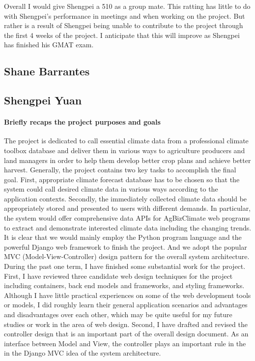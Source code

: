 \documentclass[onecolumn, draftclsnofoot,10pt, compsoc]{article}
\begin{document}
		Overall I would give Shengpei a 5\/10 as a group mate. This ratting has little to do with Shengpei's performance in meetings and when working on the project. But rather is a result of Shengpei being unable to contribute to the project through the first 4 weeks of the project. I anticipate that this will improve as Shengpei has finished his GMAT exam.\\





\subsection{Shane Barrantes}

\subsection{Shengpei Yuan}
		\paragraph{Briefly recaps the project purposes and goals} \hfill \break
		The project is dedicated to call essential climate data from a professional climate toolbox database and deliver them in various ways to agriculture producers and land managers in order to help them develop better crop plans and achieve better harvest. Generally, the project contains two key tasks to accomplish the final goal. First, appropriate climate forecast database has to be chosen so that the system could call desired climate data in various ways according to the application contexts. Secondly, the immediately collected climate data should be appropriately stored and presented to users with different demands. In particular, the system would offer comprehensive data APIs for AgBizClimate web programs to extract and demonstrate interested climate data including the changing trends.\\
		It is clear that we would mainly employ the Python program language and the powerful Django web framework to finish the project. And we adopt the popular MVC (Model-View-Controller) design pattern for the overall system architecture. During the past one term, I have finished some substantial work for the project. First, I have reviewed three candidate web design techniques for the project including containers, back end models and frameworks, and styling frameworks. Although I have little practical experiences on some of the web development tools or models, I did roughly learn their general application scenarios and advantages and disadvantages over each other, which may be quite useful for my future studies or work in the area of web design. Second, I have drafted and revised the controller design that is an important part of the overall design document. As an interface between Model and View, the controller plays an important rule in the in the Django MVC idea of the system architecture.\\
\end{document}
